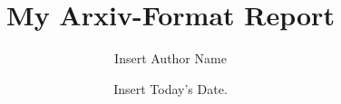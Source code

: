 \documentclass{article}%
\title{My Arxiv{-}Format Report}%
\author{Insert Author Name}%
\date{Insert Today's Date.}%
\begin{document}
%
\normalsize%
\maketitle%
\end{document}
